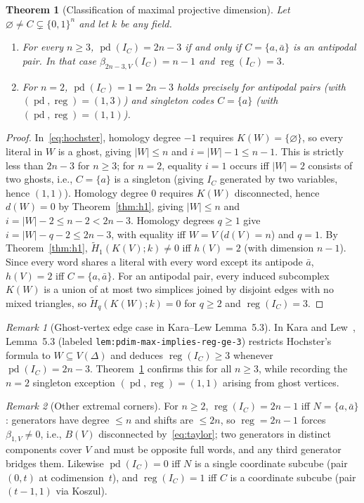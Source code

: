 \documentclass[11pt]{article}
\theoremstyle{plain}
\newtheorem{theorem}{Theorem}
\theoremstyle{definition}
\theoremstyle{remark}
\newtheorem{remark}{Remark}
\DeclareMathOperator{\pd}{pd}
\DeclareMathOperator{\reg}{reg}
\begin{document}
\begin{theorem}[Classification of maximal projective dimension]\label{thm:maxpd}
Let $\varnothing \neq C \subsetneq \{0,1\}^n$ and let $k$ be any field.
\begin{enumerate}[label=\textup{(\arabic*)}]
\item For every $n \ge 3$, $\pd(I_C) = 2n-3$ if and only if $C = \{a,\bar{a}\}$ is an antipodal pair. In that case $\beta_{2n-3,V}(I_C) = n-1$ and $\reg(I_C) = 3$.
\item For $n = 2$, $\pd(I_C) = 1 = 2n-3$ holds precisely for antipodal pairs (with $(\pd,\reg)=(1,3)$) and singleton codes $C = \{a\}$ (with $(\pd,\reg)=(1,1)$).
\end{enumerate}
\end{theorem}

\begin{proof}
In~\eqref{eq:hochster}, homology degree $-1$ requires $K(W) = \{\varnothing\}$, so every literal in $W$ is a ghost, giving $|W| \le n$ and $i = |W|-1 \le n-1$. This is strictly less than $2n-3$ for $n \ge 3$; for $n = 2$, equality $i = 1$ occurs iff $|W| = 2$ consists of two ghosts, i.e., $C = \{a\}$ is a singleton (giving $I_C$ generated by two variables, hence $(1,1)$). Homology degree $0$ requires $K(W)$ disconnected, hence $d(W) = 0$ by Theorem~\ref{thm:h1}, giving $|W| \le n$ and $i = |W|-2 \le n-2 < 2n-3$. Homology degrees $q \ge 1$ give $i = |W|-q-2 \le 2n-3$, with equality iff $W = V$ ($d(V) = n$) and $q = 1$. By Theorem~\ref{thm:h1}, $\widetilde{H}_1(K(V);k) \neq 0$ iff $h(V) = 2$ (with dimension $n-1$). Since every word shares a literal with every word except its antipode $\bar{a}$, $h(V) = 2$ iff $C = \{a,\bar{a}\}$. For an antipodal pair, every induced subcomplex $K(W)$ is a union of at most two simplices joined by disjoint edges with no mixed triangles, so $\widetilde{H}_q(K(W);k) = 0$ for $q \ge 2$ and $\reg(I_C) = 3$.
\end{proof}

\begin{remark}[Ghost-vertex edge case in Kara--Lew Lemma~5.3]
In Kara and Lew~\cite{KaraLew2026}, Lemma~5.3 (labeled \texttt{lem:pdim-max-implies-reg-ge-3}) restricts Hochster's formula to $W \subseteq V(\Delta)$ and deduces $\reg(I_C) \ge 3$ whenever $\pd(I_C) = 2n-3$. Theorem~\ref{thm:maxpd} confirms this for all $n \ge 3$, while recording the $n = 2$ singleton exception $(\pd,\reg) = (1,1)$ arising from ghost vertices.
\end{remark}

\begin{remark}[Other extremal corners]
For $n \ge 2$, $\reg(I_C) = 2n-1$ iff $N = \{a,\bar{a}\}$: generators have degree $\le n$ and shifts are $\le 2n$, so $\reg = 2n-1$ forces $\beta_{1,V} \neq 0$, i.e., $B(V)$ disconnected by~\eqref{eq:taylor}; two generators in distinct components cover $V$ and must be opposite full words, and any third generator bridges them. Likewise $\pd(I_C) = 0$ iff $N$ is a single coordinate subcube (pair $(0,t)$ at codimension~$t$), and $\reg(I_C) = 1$ iff $C$ is a coordinate subcube (pair $(t-1,1)$ via Koszul).
\end{remark}
\end{document}
